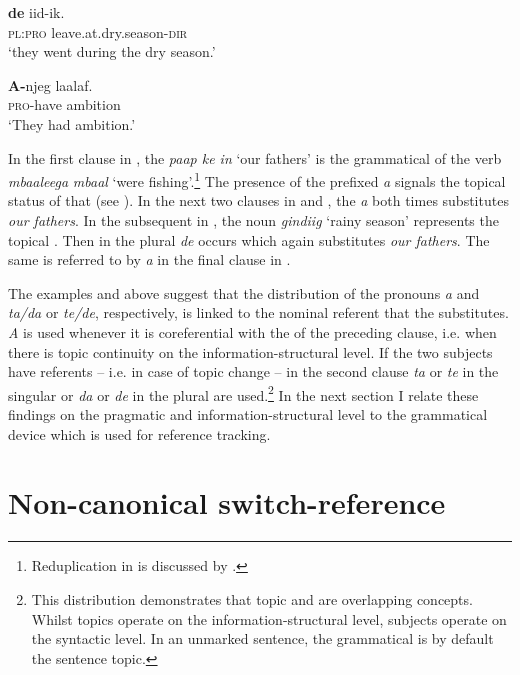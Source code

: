 \documentclass[output=paper,newtxmath,modfonts,nonflat,hidelinks]{langsci/langscibook}
\begin{document}
\ex\label{ex:apel:17e}
\gll \textbf{de} iid-ik.  \\
     \textsc{pl:pro} leave.at.dry.season-\textsc{dir}\\
\glt ‘they went during the dry season.’
 

\ex\label{ex:apel:17f}
\gll \textbf{A-}njeg laalaf.\\
     \textsc{pro-}have ambition\\
\glt ‘They had ambition.’
\z
\z

In the first clause in , the  \textit{paap ke in} ‘our fathers’ is the grammatical  of the verb \textit{mbaaleega} \textit{mbaal} ‘were fishing’.\footnote{Reduplication in  is discussed by \citet{Heath2014}.} The presence of the prefixed  \textit{a} signals the topical status of that  (see ). In the next two clauses in  and , the  \textit{a} both times substitutes \textit{our fathers}. In the subsequent  in , the noun \textit{gindiig} ‘rainy season’ represents the topical . Then in  the plural  \textit{de} occurs which again substitutes \textit{our fathers}. The same  is referred to by \textit{a} in the final clause in .

The examples  and  above suggest that the distribution of the  pronouns \textit{a} and \textit{ta/da} or \textit{te/de}, respectively, is linked to the nominal referent that the  substitutes. \textit{A} is used whenever it is coreferential with the  of the preceding clause, i.e. when there is topic continuity on the information-structural level. If the two subjects have  referents -- i.e. in case of topic change -- in the second clause \textit{ta} or \textit{te} in the singular or \textit{da} or \textit{de} in the plural are used.\footnote{This distribution demonstrates that topic and  are overlapping concepts. Whilst topics operate on the information-structural level, subjects operate on the syntactic level. In an unmarked sentence, the grammatical  is by default the sentence topic.} In the next section I relate these findings on the pragmatic and information-structural level to the grammatical device  which is used for reference tracking.

\section{Non-canonical switch-reference}\label{sec:apel:3}
\end{document}
